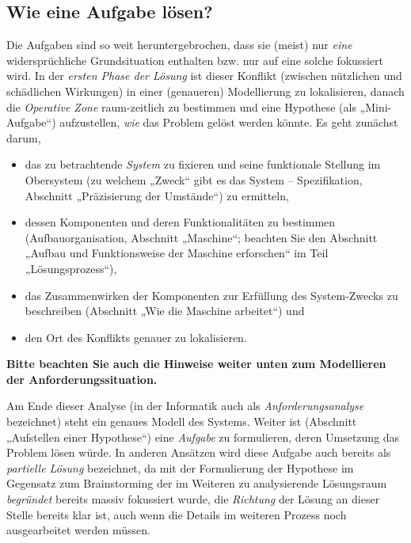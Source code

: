 \documentclass[11pt,a4paper]{article}
\begin{document}
\subsection{Wie eine Aufgabe lösen?}

Die Aufgaben sind so weit heruntergebrochen, dass sie (meist) nur \emph{eine}
widersprüchliche Grundsituation enthalten bzw. nur auf eine solche fokussiert
wird.  In der \emph{ersten Phase der Lösung} ist dieser Konflikt (zwischen
nützlichen und schädlichen Wirkungen) in einer (genaueren) Modellierung zu
lokalisieren, danach die \emph{Operative Zone} raum-zeitlich zu bestimmen und
eine Hypothese (als „Mini-Aufgabe“) aufzustellen, \emph{wie} das Problem
gelöst werden könnte. Es geht zunächst darum,
\begin{itemize}
\item das zu betrachtende \emph{System} zu fixieren und seine funktionale
  Stellung im Obersystem (zu welchem „Zweck“ gibt es das System --
  Spezifikation, Abschnitt „Präzisierung der Umstände“) zu ermitteln,
\item dessen Komponenten und deren Funktionalitäten zu bestimmen
  (Aufbauorganisation, Abschnitt „Maschine“; beachten Sie den Abschnitt
  „Aufbau und Funktionsweise der Maschine erforschen“ im Teil
  „Lösungsprozess“),
\item das Zusammenwirken der Komponenten zur Erfüllung des System-Zwecks zu
  beschreiben (Abschnitt „Wie die Maschine arbeitet“) und 
\item den Ort des Konflikts genauer zu lokalisieren.  
\end{itemize}
\textbf{Bitte beachten Sie auch die Hinweise weiter unten zum Modellieren der
  Anforderungssituation.}

Am Ende dieser Analyse (in der Informatik auch als \emph{Anforderungsanalyse}
bezeichnet) steht ein genaues Modell des Systems.  Weiter ist (Abschnitt
„Aufstellen einer Hypothese“) eine \emph{Aufgabe} zu formulieren, deren
Umsetzung das Problem lösen würde. In anderen Ansätzen wird diese Aufgabe auch
bereits als \emph{partielle Lösung} bezeichnet, da mit der Formulierung der
Hypothese im Gegensatz zum Brainstorming der im Weiteren zu analysierende
Lösungsraum \emph{begründet} bereits massiv fokussiert wurde, die
\emph{Richtung} der Lösung an dieser Stelle bereits klar ist, auch wenn die
Details im weiteren Prozess noch ausgearbeitet werden müssen.
\end{document}
